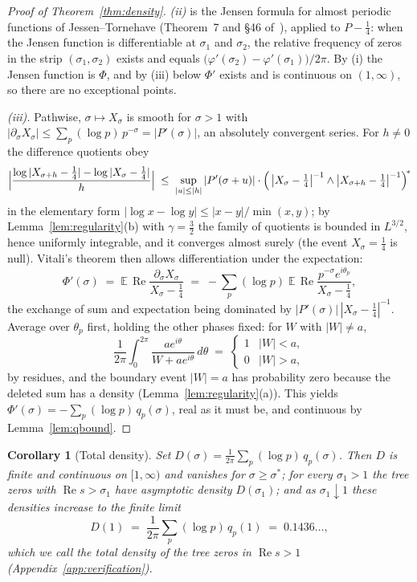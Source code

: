 \documentclass[11pt]{article}
\numberwithin{equation}{section}
\theoremstyle{plain}
\newtheorem{corollary}[theorem]{Corollary}
\theoremstyle{definition}
\theoremstyle{remark}
\begin{document}
\begin{proof}[Proof of Theorem~\ref{thm:density}]
\emph{(ii)} is the Jensen formula for almost periodic functions of
Jessen--Tornehave (Theorem~7 and \S46 of~\cite{jessentornehave}), applied to
$P - \tfrac14$: when the Jensen function is differentiable at $\sigma_1$ and
$\sigma_2$, the relative frequency of zeros in the strip $(\sigma_1, \sigma_2)$
exists and equals $\bigl(\varphi'(\sigma_2) - \varphi'(\sigma_1)\bigr)/2\pi$. By (i)
the Jensen function is $\Phi$, and by (iii) below $\Phi'$ exists and is continuous
on $(1, \infty)$, so there are no exceptional points.

\emph{(iii).} Pathwise, $\sigma \mapsto X_\sigma$ is smooth for $\sigma > 1$ with
$|\partial_\sigma X_\sigma| \le \sum_p (\log p)\, p^{-\sigma} = |P'(\sigma)|$, an
absolutely convergent series. For $h \ne 0$ the difference quotients obey
\[
\Bigl|\frac{\log|X_{\sigma+h} - \tfrac14| - \log|X_\sigma - \tfrac14|}{h}\Bigr|
\;\le\; \sup_{|u| \le |h|} |P'(\sigma+u)| \cdot
\Bigl(\,\bigl|X_\sigma - \tfrac14\bigr|^{-1} \wedge
\bigl|X_{\sigma+h} - \tfrac14\bigr|^{-1}\Bigr)^{\!*}
\]
in the elementary form $|\log x - \log y| \le |x - y|/\min(x, y)$; by
Lemma~\ref{lem:regularity}(b) with $\gamma = \tfrac32$ the family of quotients is
bounded in $L^{3/2}$, hence uniformly integrable, and it converges almost surely
(the event $X_\sigma = \tfrac14$ is null). Vitali's theorem then allows
differentiation under the expectation:
\[
\Phi'(\sigma) \;=\; \mathbb{E}\, \operatorname{Re}
\frac{\partial_\sigma X_\sigma}{X_\sigma - \tfrac14}
\;=\; -\sum_p (\log p)\; \mathbb{E}\, \operatorname{Re}
\frac{p^{-\sigma} e^{i\theta_p}}{X_\sigma - \tfrac14},
\]
the exchange of sum and expectation being dominated by
$|P'(\sigma)|\,|X_\sigma - \tfrac14|^{-1}$. Average over $\theta_p$ first, holding
the other phases fixed: for $W$ with $|W| \neq a$,
\[
\frac{1}{2\pi}\int_0^{2\pi} \frac{a e^{i\theta}}{W + a e^{i\theta}}\, d\theta
\;=\;
\begin{cases} 1 & |W| < a, \\ 0 & |W| > a, \end{cases}
\]
by residues, and the boundary event $|W| = a$ has probability zero because the
deleted sum has a density (Lemma~\ref{lem:regularity}(a)). This yields
$\Phi'(\sigma) = -\sum_p (\log p)\, q_p(\sigma)$, real as it must be, and continuous
by Lemma~\ref{lem:qbound}.
\end{proof}

\begin{corollary}[Total density]\label{cor:totaldensity}
Set $D(\sigma) = \frac{1}{2\pi}\sum_p (\log p)\, q_p(\sigma)$. Then $D$ is finite
and continuous on $[1, \infty)$ and vanishes for $\sigma \ge \sigma^{*}$; for every
$\sigma_1 > 1$ the tree zeros with $\operatorname{Re} s > \sigma_1$ have asymptotic
density $D(\sigma_1)$; and as $\sigma_1 \downarrow 1$ these densities increase to
the finite limit
\[
D(1) \;=\; \frac{1}{2\pi} \sum_p (\log p)\, q_p(1) \;=\; 0.1436\ldots,
\]
which we call the \emph{total density} of the tree zeros in
$\operatorname{Re} s > 1$ (Appendix~\ref{app:verification}).
\end{corollary}
\end{document}
